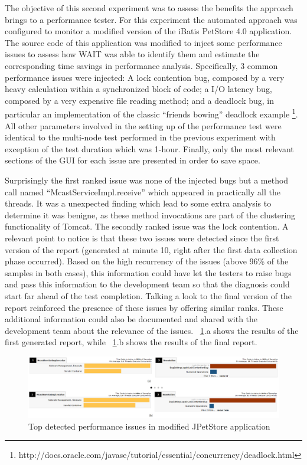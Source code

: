 \documentclass[runningheads,a4paper]{llncs}
\begin{document}
The objective of this second experiment was to assess the benefits the approach
brings to a performance tester. For this experiment the automated approach was
configured to monitor a modified version of the iBatis PetStore 4.0 application.
The source code of this application was modified to inject some performance
issues to assess how WAIT was able to identify them and estimate the corresponding 
time savings in performance analysis. Specifically, 3 common performance issues were 
injected: A lock contention bug, composed by a very heavy calculation within a
synchronized block of code; a I/O latency bug, composed by a very expensive file reading 
method; and a deadlock bug, in particular an implementation of the classic
``friends bowing'' deadlock example
\footnote{http://docs.oracle.com/javase/tutorial/essential/concurrency/deadlock.html}.
All other parameters involved in the setting up of the performance test were
identical to the multi-node test performed in the previous experiment with
exception of the test duration which was 1-hour. Finally, only the most relevant
sections of the GUI for each issue are presented in order to save space.

Surprisingly the first ranked issue was none of the injected bugs but
a method call named ``McastServiceImpl.receive'' which appeared in practically all
the threads. It was a unexpected finding which lead to some extra analysis
to determine it was benigne, as these method invocations are part of the
clustering functionality of Tomcat. The secondly ranked issue was the lock
contention. A relevant point to notice is that these two issues were
detected since the first version of the report (generated at minute 10, right
after the first data collection phase occurred). Based on the high recurrency of
the issues (above 96\% of the samples in both cases), this information could
have let the testers to raise bugs and pass this information to the development
team so that the diagnosis could start far ahead of the test completion. Talking a
look to the final version of the report reinforced the presence of these issues
by offering similar ranks. These additional information could also be documented
and shared with the development team about the relevance of the issues.
\figurename ~\ref{fig_run1_bugs12}.a shows the results of the first generated report, 
while ~\ref{fig_run1_bugs12}.b shows the results of the final report.

\begin{figure}[!h]
\includegraphics[totalheight=.25\textheight,width=1\textwidth]{run1_issues12_short_long_run}
\caption{Top detected performance issues in modified JPetStore application}
\label{fig_run1_bugs12}
\end{figure}
\end{document}
